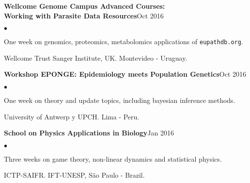 \documentclass[margin,line]{res}
\newenvironment{list2}{
  \begin{list}{$\bullet$}{%
      \setlength{\itemsep}{0in}
      \setlength{\parsep}{0in} \setlength{\parskip}{0in}
      \setlength{\topsep}{0in} \setlength{\partopsep}{0in}
      \setlength{\leftmargin}{0.2in}}}{\end{list}}
\begin{document}
\begin{resume}
{\bf Wellcome Genome Campus Advanced Courses:\\Working with Parasite Data Resources}\hfill {Oct 2016}\\
	\vspace*{-.1in}%
\begin{list2} %
	\item One week on genomics, proteomics, metabolomics applications of \texttt{eupathdb.org}.
	\item Wellcome Trust Sanger Institute, UK. Montevideo - Uruguay.%
\end{list2}

{\bf Workshop EPONGE: Epidemiology meets Population Genetics}\hfill {Oct 2016}\\
	\vspace*{-.1in}
\begin{list2} %
	\item One week on theory and update topics, including bayesian inference methods.
	\item University of Antwerp y UPCH. Lima - Peru.
\end{list2}

{\bf School on Physics Applications in Biology}\hfill {Jan 2016}\\
	\vspace*{-.1in}%
\begin{list2} %
	\item Three weeks on game theory, non-linear dynamics and statistical physics.%
	\item ICTP-SAIFR. IFT-UNESP, S{\~a}o Paulo - Brazil. %
\end{list2}


\end{resume}
\end{document}

